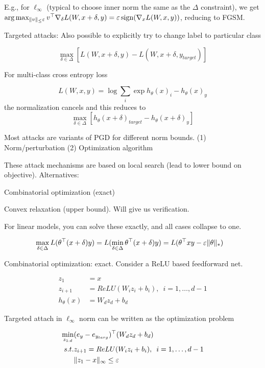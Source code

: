 \documentclass[english]{article}
\begin{document}
E.g., for $\ell_\infty$ (typical to choose inner norm the same as the $\Delta$ constraint), we get $\arg\max_{\|v\|_\le \varepsilon} v^\top \nabla_\delta L(W,x+\delta,y) = \varepsilon \operatorname{sign}(\nabla_x L(W,x,y))$, reducing to FGSM.

\item Targeted attacks: Also possible to explicitly try to change label to particular class 

$$\max_{\delta\in \Delta}[
L(W,x+\delta,y)
- 
L(W,x+\delta,y_{target})]
$$

For multi-class cross entropy loss 

$$
L(W,x,y)
= 
\log\sum_i \exp h_{\theta}(x)_i- h_{\theta}(x)_y
$$
the normalization cancels and this reduces to
$$\max_{\delta\in \Delta}[
h_{\theta}(x+\delta)_{target}
- 
h_{\theta}(x+\delta)_y]
$$

Most attacks are variants of PGD for different norm bounds. (1) Norm/perturbation (2) Optimization algorithm


\item These attack mechanisms are based on local search (lead to lower bound on objective). Alternatives: 

Combinatorial optimization (exact)

Convex relaxation (upper bound). Will give us verification. 

For linear models, you can solve these exactly, and all cases collapse to one. 


\begin{align*}
&\max_{\delta\in\Delta} L(\theta^\top(x+\delta)y) =
L(\min_{\delta\in\Delta}\theta^\top(x+\delta)y)= 
L(\theta^\top xy-\varepsilon \|\theta\|_*)
\end{align*}

\item Combinatorial optimization: exact. Consider a ReLU based feedforward net. 

\begin{align*}
z_1&=x\\
z_{i+1} &= ReLU(W_iz_i+b_i),\,\,\,i=1,\ldots,d-1\\
h_\theta(x)&=W_dz_d+b_d
\end{align*}

Targeted attach in $\ell_\infty$ norm can be written as the optimization problem

\begin{align*}
\min_{z_{1:d}}& (e_y-e_{y_{targ}})^\top (W_d z_d + b_d)\\
s.t.& z_{i+1}= ReLU(W_iz_i+b_i),\,\,\,i=1,\ldots,d-1\\
&\|z_1-x\|_\infty\le \varepsilon
\end{align*}
\end{document}
